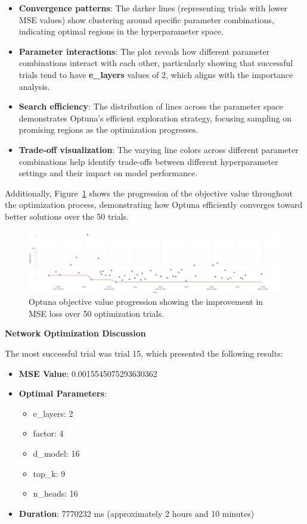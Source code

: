 \begin{itemize}
    \item \textbf{Convergence patterns}: The darker lines (representing trials with lower MSE values) show clustering around specific parameter combinations, indicating optimal regions in the hyperparameter space.
    \item \textbf{Parameter interactions}: The plot reveals how different parameter combinations interact with each other, particularly showing that successful trials tend to have \textbf{e\_layers} values of 2, which aligns with the importance analysis.
    \item \textbf{Search efficiency}: The distribution of lines across the parameter space demonstrates Optuna's efficient exploration strategy, focusing sampling on promising regions as the optimization progresses.
    \item \textbf{Trade-off visualization}: The varying line colors across different parameter combinations help identify trade-offs between different hyperparameter settings and their impact on model performance.
\end{itemize}

Additionally, Figure~\ref{fig:optuna_objective} shows the progression of the objective value throughout the optimization process, demonstrating how Optuna efficiently converges toward better solutions over the 50 trials.

\begin{figure}[htbp]
    \centering
    \includegraphics[width=1\textwidth]{imgs/optuna_objective_plot.png}
    \caption{Optuna objective value progression showing the improvement in MSE loss over 50 optimization trials.}
    \label{fig:optuna_objective}
\end{figure}

\textbf{Network Optimization Discussion}
\label{subsec:best_trial_results}

The most successful trial was trial 15, which presented the following results:

\begin{itemize}
    \item \textbf{MSE Value}: 0.0015545075293630362
    \item \textbf{Optimal Parameters}:
    \begin{itemize}
        \item e\_layers: 2
        \item factor: 4  
        \item d\_model: 16
        \item top\_k: 9
        \item n\_heads: 16
    \end{itemize}
    \item \textbf{Duration}: 7770232 ms (approximately 2 hours and 10 minutes)
\end{itemize}

